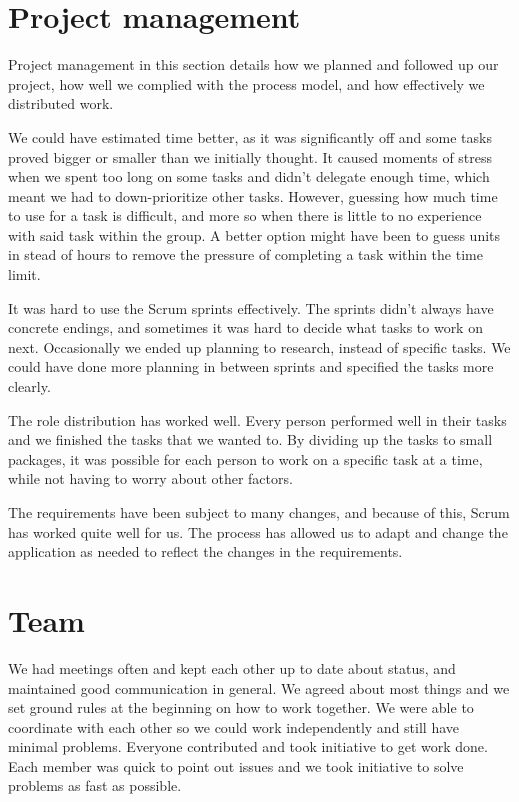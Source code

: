 \section{Project management}

Project management in this section details how we planned and followed up our project, how well we complied with the process model, and how effectively we distributed work.\newline

We could have estimated time better, as it was significantly off and some tasks proved bigger or smaller than we initially thought. It caused moments of stress when we spent too long on some tasks and didn't delegate enough time, which meant we had to down-prioritize other tasks. However, guessing how much time to use for a task is difficult, and more so when there is little to no experience with said task within the group. A better option might have been to guess units in stead of hours to remove the pressure of completing a task within the time limit.\newline

It was hard to use the Scrum sprints effectively. The sprints didn't always have concrete endings, and sometimes it was hard to decide what tasks to work on next. Occasionally we ended up planning to research, instead of specific tasks. We could have done more planning in between sprints and specified the tasks more clearly.\newline

The role distribution has worked well. Every person performed well in their tasks and we finished the tasks that we wanted to. By dividing up the tasks to small packages, it was possible for each person to work on a specific task at a time, while not having to worry about other factors.\newline

The requirements have been subject to many changes, and because of this, Scrum has worked quite well for us. The process has allowed us to adapt and change the application as needed to reflect the changes in the requirements.

\section{Team}

We had meetings often and kept each other up to date about status, and maintained good communication in general. We agreed about most things and we set ground rules at the beginning on how to work together. We were able to coordinate with each other so we could work independently and still have minimal problems. Everyone contributed and took initiative to get work done. Each member was quick to point out issues and we took initiative to solve problems as fast as possible.\newline

